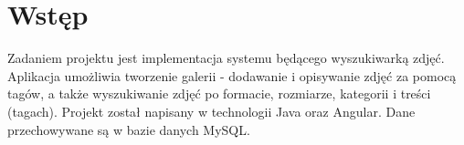 \section{Wstęp}
Zadaniem projektu jest implementacja systemu będącego wyszukiwarką zdjęć. Aplikacja umożliwia tworzenie galerii - dodawanie i opisywanie zdjęć za pomocą tagów, a także wyszukiwanie zdjęć po formacie, rozmiarze, kategorii i treści (tagach). Projekt został napisany w technologii Java oraz Angular. Dane przechowywane są w bazie danych MySQL.
